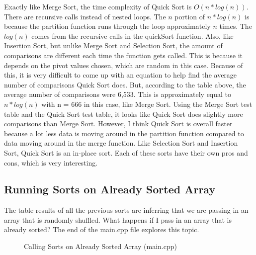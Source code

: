 \documentclass[letterpaper, 10pt]{article}
\begin{document}
\noindent
Exactly like Merge Sort, the time complexity of Quick Sort is $O(n * log(n))$. There are recursive calls instead of nested loops. The $n$ portion of $n * log(n)$ is because the partition function runs through the loop approximately $n$ times. The $log(n)$ comes from the recursive calls in the quickSort function. Also, like Insertion Sort, but unlike Merge Sort and Selection Sort, the amount of comparisons are different each time the function gets called. This is because it depends on the pivot values chosen, which are random in this case. Because of this, it is very difficult to come up with an equation to help find the average number of comparisons Quick Sort does. But, according to the table above, the average number of comparisons were 6,533. This is approximately equal to $n * log(n)$ with n = 666 in this case, like Merge Sort. Using the Merge Sort test table and the Quick Sort test table, it looks like Quick Sort does slightly more comparisons than Merge Sort. However, I think Quick Sort is overall faster because a lot less data is moving around in the partition function compared to data moving around in the merge function. Like Selection Sort and Insertion Sort, Quick Sort is an in-place sort. Each of these sorts have their own pros and cons, which is very interesting.

\subsection{Running Sorts on Already Sorted Array}
\noindent
The table results of all the previous sorts are inferring that we are passing in an array that is randomly shuffled. What happens if I pass in an array that is already sorted? The end of the main.cpp file explores this topic.
\begin{figure}[H]
  \centering
  
  \label{fig:figure4.9-part1}
\end{figure}
\begin{figure}[H]
  \centering
  
  \caption{Calling Sorts on Already Sorted Array (main.cpp)}
  \label{fig:figure4.9-part2}
\end{figure}
\end{document}
